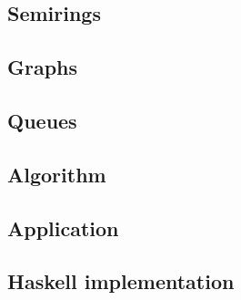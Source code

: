 \subsection{Semirings}

\subsection{Graphs}

\subsection{Queues}

\subsection{Algorithm}

\subsection{Application}

\subsection{Haskell implementation}
